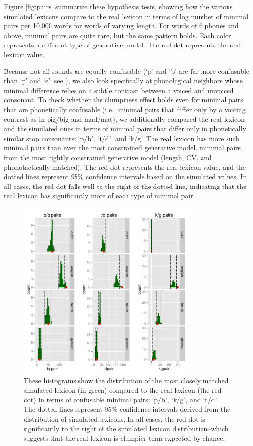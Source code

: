 \documentclass{article}
\begin{document}
Figure \ref{fig:pairs} summarize these hypothesis tests, showing how the various simulated lexicons compare to
the real lexicon in terms of log number of minimal pairs per 10,000 words for words of varying length. For
words of 6 phones and above, minimal pairs are quite rare, but the same pattern holds. Each color represents a
different type of generative model. The red
dot represents the real lexicon value.

Because not all sounds are equally confusable (`p' and `b' are far more confusable than `p' and `e'; see
\cite{graff_2012} ), we also look specifically at phonological neighbors whose minimal difference relies on a
subtle contrast between a voiced and unvoiced consonant. To check whether the clumpiness effect holds even for
minimal pairs that are phonetically confusable (i.e., minimal pairs that differ only by a voicing contrast as
in pig/big and mad/mat), we additionally compared the real lexicon and the simulated ones in terms of minimal
pairs that differ only in phonetically similar stop consonants: `p/b', `t/d', and `k/g'. The real lexicon has
more such minimal pairs than even the most constrained generative model. minimal pairs from the most tightly
constrained generative model (length, CV, and phonotactically matched). The red dot represents the real
lexicon value, and the dotted lines represent 95\% confidence intervals based on the simulated values. In all
cases, the red dot falls well to the right of the dotted line, indicating that the real lexicon has
significantly more of each type of minimal pair.


\begin{figure}
\centering \includegraphics[width=0.8\textwidth]{PDFs/specific_mps.pdf}
  \caption{These histograms show the distribution of the most closely matched simulated lexicon (in green)
compared to the real lexicon (the red dot) in terms of confusable minimal pairs: `p/b', `k/g', and `t/d'. The
dotted lines represent 95\% confidence intervals derived from the distribution of simulated lexicons. In all
cases, the red dot is significantly to the right of the simulated lexicon distribution--which suggests that
the real lexicon is clumpier than expected by chance. }
  \label{3pairs}
\end{figure}
\end{document}
